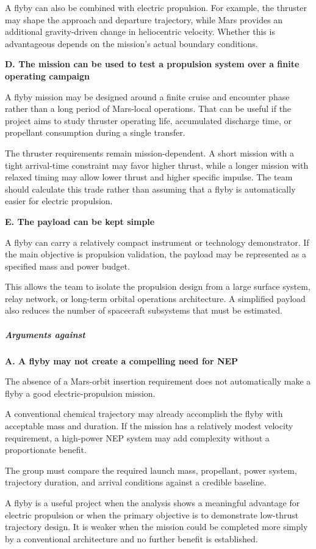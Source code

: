 A flyby can also be combined with electric propulsion. For
example, the thruster may shape the approach and departure
trajectory, while Mars provides an additional gravity-driven
change in heliocentric velocity. Whether this is advantageous
depends on the mission's actual boundary conditions.

\textbf{D. The mission can be used to test a propulsion
	system over a finite operating campaign}

A flyby mission may be designed around a finite cruise and
encounter phase rather than a long period of Mars-local
operations. That can be useful if the project aims to study
thruster operating life, accumulated discharge time, or
propellant consumption during a single transfer.

The thruster requirements remain mission-dependent. A short
mission with a tight arrival-time constraint may favor higher
thrust, while a longer mission with relaxed timing may allow
lower thrust and higher specific impulse. The team should
calculate this trade rather than assuming that a flyby is
automatically easier for electric propulsion.

\textbf{E. The payload can be kept simple}

A flyby can carry a relatively compact instrument or technology
demonstrator. If the main objective is propulsion validation,
the payload may be represented as a specified mass and power
budget.

This allows the team to isolate the propulsion design from
a large surface system, relay network, or long-term orbital
operations architecture. A simplified payload also reduces
the number of spacecraft subsystems that must be estimated.

\subparagraph{Arguments against}

\textbf{A. A flyby may not create a compelling need for NEP}

The absence of a Mars-orbit insertion requirement does not
automatically make a flyby a good electric-propulsion mission.

A conventional chemical trajectory may already accomplish
the flyby with acceptable mass and duration. If the mission
has a relatively modest velocity requirement, a high-power
NEP system may add complexity without a proportionate benefit.

The group must compare the required launch mass, propellant,
power system, trajectory duration, and arrival conditions
against a credible baseline.

A flyby is a useful project when the analysis shows a meaningful
advantage for electric propulsion or when the primary objective
is to demonstrate low-thrust trajectory design. It is weaker
when the mission could be completed more simply by a conventional
architecture and no further benefit is established.


